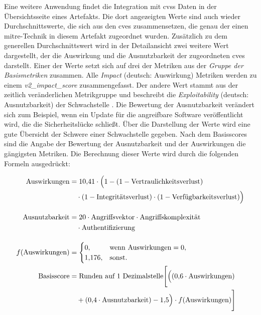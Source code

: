 \par Eine weitere Anwendung findet die Integration mit \gls{cvss} Daten in der Übersichtsseite eines Artefakts. Die dort angezeigten Werte sind auch wieder Durchschnittswerte, die sich aus den \glspl{cve} zusammensetzen, die genau der einen \gls{mitre}-Technik in diesem Artefakt zugeordnet wurden. Zusätzlich zu dem generellen Durchschnittswert wird in der Detailansicht zwei weitere Wert dargestellt, der die Auswirkung und die Ausnutzbarkeit der zugeordneten \glspl{cve} darstellt. Einer der Werte setzt sich auf drei der Metriken aus der \textit{Gruppe der Basismetriken} zusammen. Alle \textit{Impact} (deutsch: Auswirkung) Metriken werden zu einem \textit{v2\_impact\_score} zusammengefasst. Der andere Wert stammt aus der zeitlich veränderlichen Metrikgruppe und beschreibt die \textit{Exploitability} (deutsch: Ausnutzbarkeit) der Schwachstelle \autocite{CVSSV2Complete}. Die Bewertung der Ausnutzbarkeit verändert sich zum Beispiel, wenn ein Update für die angreifbare Software veröffentlicht wird, die die Sicherheitslücke schließt.
Über die Darstellung der Werte wird eine gute Übersicht der Schwere einer Schwachstelle gegeben. Nach dem Basisscores sind die Angabe der Bewertung der Ausnutzbarkeit und der Auswirkungen die gängigsten Metriken. Die Berechnung dieser Werte wird durch die folgenden Formeln ausgedrückt:

\begin{align*}
    \text{Auswirkungen}    & = 10{,}41 \cdot \Big( 1
    - (1 - \text{Vertraulichkeitsverlust}) \notag                                      \\
                           & \quad \cdot (1 - \text{Integritätsverlust})
    \cdot (1 - \text{Verfügbarkeitsverlust}) \Big) \notag                              \\[10pt]
    \text{Ausnutzbarkeit}  & = 20 \cdot \text{Angriffsvektor}
    \cdot \text{Angriffskomplexität} \notag                                            \\
                           & \quad \cdot \text{Authentifizierung} \notag               \\[10pt]
    f(\text{Auswirkungen}) & =
    \begin{cases}
        0,       & \text{wenn Auswirkungen} = 0, \\
        1{,}176, & \text{sonst.}
    \end{cases}                                           \\
    \text{Basisscore}      & = \text{Runden auf 1 Dezimalstelle} \Bigg[ \Big(
    (0{,}6 \cdot \text{Auswirkungen}) \notag                                           \\
                           & \quad + (0{,}4 \cdot \text{Ausnutzbarkeit}) - 1{,}5 \Big)
    \cdot f(\text{Auswirkungen}) \Bigg] \notag                                         \\[10pt]
\end{align*}

